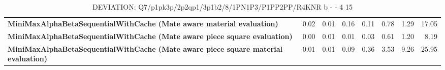 \begin{table}[H]
{\begin{tabular}{|p{8cm}|*{7}{r|}}
            \rowcolor[HTML]{EFEFEF}
            \textbf{MiniMaxAlphaBetaSequentialWithCache (Mate aware material evaluation)}               & 0.02 & 0.01 & 0.16 & 0.11 & 0.78 & 1.29 & 17.05 \\
            \rowcolor[HTML]{FFFFFF}
            \textbf{MiniMaxAlphaBetaSequentialWithCache (Mate aware piece square evaluation)}               & 0.00 & 0.01 & 0.01 & 0.03 & 0.61 & 1.20 & 8.19 \\
            \rowcolor[HTML]{EFEFEF}
            \textbf{MiniMaxAlphaBetaSequentialWithCache (Mate aware piece square material evaluation)}               & 0.01 & 0.01 & 0.09 & 0.36 & 3.53 & 9.26 & 25.95 \\

            \hline
        \end{tabular}%
    }
    \caption{DEVIATION: Q7/p1pk3p/2p2qp1/3p1b2/8/1PN1P3/P1PP2PP/R4KNR b - - 4 15}
    \label{tab:mid-game---discovery---mate-in-2---short-deviation}
\end{table}
